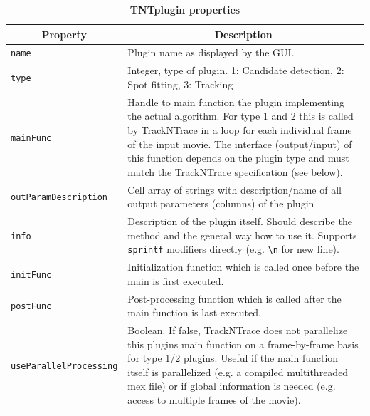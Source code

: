 \documentclass[11pt,onside]{report}
\numberwithin{equation}{chapter}
\begin{document}
\begin{table}[!h]
\centering
\caption*{\textbf{TNTplugin properties}}
\begin{tabular}{p{} p{}}
\toprule
\multicolumn{1}{c}{Property} & \multicolumn{1}{c}{Description}\\ \midrule
  \texttt{name} & Plugin name as displayed by the GUI. \\
  \texttt{type} & Integer, type of plugin. 1: Candidate detection, 2: Spot fitting, 3: Tracking \\
  \texttt{mainFunc} & Handle to main function the plugin implementing the actual algorithm. For type 1 and 2 this is called by TrackNTrace in a loop for each individual frame of the input movie. The interface (output/input) of this function depends on the plugin type and must match the TrackNTrace specification (see below). \\
  \texttt{outParamDescription} &  Cell array of strings with description/name of all output parameters (columns) of the plugin \\
 \texttt{info} & Description of the plugin itself. Should describe the method and the general way how to use it. Supports \texttt{sprintf} modifiers directly (e.g. \texttt{\textbackslash n} for new line). \\
  \texttt{initFunc} &  Initialization function which is called once before the main is first executed. \\
  \texttt{postFunc} & Post-processing function which is called after the main function is last executed. \\
  \texttt{useParallelProcessing}&  Boolean. If false, TrackNTrace does not parallelize this plugins main function on a frame-by-frame basis for type 1/2 plugins. Useful if the main function itself is parallelized (e.g. a compiled multithreaded mex file) or if global information is needed (e.g. access to multiple frames of the movie).\\
  \bottomrule
\end{tabular}\\
\end{table}
\end{document}
